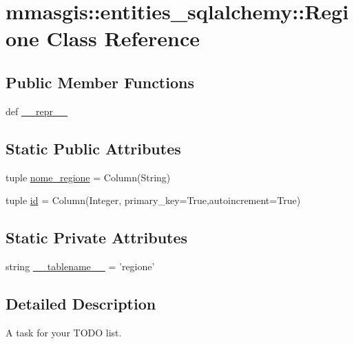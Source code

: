 \hypertarget{classmmasgis_1_1entities__sqlalchemy_1_1Regione}{
\section{mmasgis::entities\_\-sqlalchemy::Regione Class Reference}
\label{classmmasgis_1_1entities__sqlalchemy_1_1Regione}
}
\subsection*{Public Member Functions}
\begin{DoxyCompactItemize}
\item 
def \hyperlink{classmmasgis_1_1entities__sqlalchemy_1_1Regione_a5e85d0d176f390cb1db78731e1e37c80}{\_\-\_\-repr\_\-\_\-}
\end{DoxyCompactItemize}
\subsection*{Static Public Attributes}
\begin{DoxyCompactItemize}
\item 
tuple \hyperlink{classmmasgis_1_1entities__sqlalchemy_1_1Regione_a7bcdf87ccc9f500500e3dbfe18dece61}{nome\_\-regione} = Column(String)
\item 
tuple \hyperlink{classmmasgis_1_1entities__sqlalchemy_1_1Regione_a9c47da6e1cff6a719cf39f1d7db84472}{id} = Column(Integer, primary\_\-key=True,autoincrement=True)
\end{DoxyCompactItemize}
\subsection*{Static Private Attributes}
\begin{DoxyCompactItemize}
\item 
string \hyperlink{classmmasgis_1_1entities__sqlalchemy_1_1Regione_a9e6b64f9904c976bf50dc736eeddc501}{\_\-\_\-tablename\_\-\_\-} = 'regione'
\end{DoxyCompactItemize}


\subsection{Detailed Description}
\begin{DoxyVerb}
A task for your TODO list.
\end{DoxyVerb}
 

